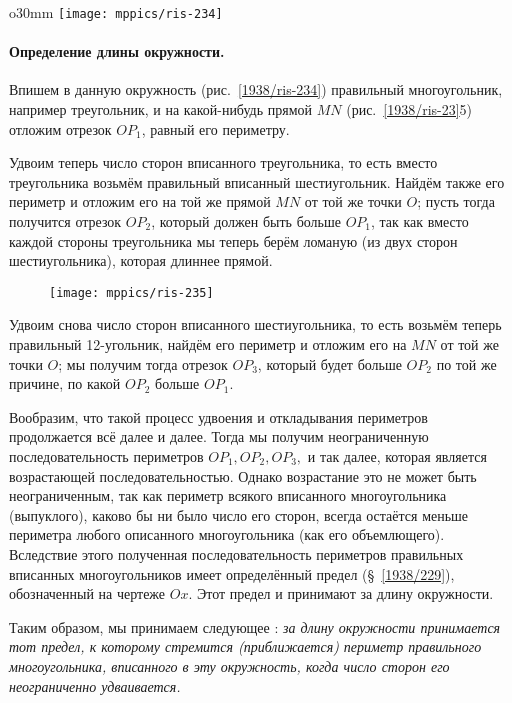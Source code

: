 \begin{wrapfigure}{o}{30mm}
\centering
\texttt{[image: mppics/ris-234]}
\caption{}\label{1938/ris-234}
\end{wrapfigure}

\paragraph{Определение длины окружности.}\label{1938/234}
Впишем в данную окружность (рис.~\ref{1938/ris-234}) правильный многоугольник, например треугольник, и на какой-нибудь прямой $MN$ (рис.~\ref{1938/ris-23}5) отложим отрезок $OP_1$, равный его периметру.

Удвоим теперь число сторон вписанного треугольника, то есть
вместо треугольника возьмём правильный вписанный шестиугольник.
Найдём также его периметр и отложим его на той же прямой $MN$ от той же точки $O$;
пусть тогда получится отрезок $OP_2$, который должен быть больше $OP_1$, так как вместо каждой стороны треугольника мы теперь берём ломаную (из двух сторон шестиугольника), которая длиннее прямой.

\begin{figure}[!ht]
\centering
\texttt{[image: mppics/ris-235]}
\caption{}\label{1938/ris-235}
\end{figure}

Удвоим снова число сторон вписанного шестиугольника, то есть возьмём теперь правильный 12-угольник, найдём его периметр и отложим его на $MN$ от той же точки $O$; 
мы получим тогда отрезок $OP_3$, который будет больше $OP_2$ по той же причине, по какой $OP_2$ больше $OP_1$.

Вообразим, что такой процесс удвоения и откладывания периметров продолжается всё далее и далее.
Тогда мы получим неограниченную последовательность периметров $OP_1, OP_2, OP_3,$ и так далее, которая является возрастающей последовательностью.
Однако возрастание это не может быть неограниченным, так как периметр всякого вписанного многоугольника (выпуклого), каково бы ни было число его сторон, всегда остаётся меньше периметра любого описанного многоугольника (как его объемлющего).
Вследствие этого полученная последовательность периметров правильных вписанных многоугольников имеет определённый предел (§~\ref{1938/229}), обозначенный на чертеже $Ox$.
Этот предел и принимают за длину окружности.

Таким образом, мы принимаем следующее :
\emph{за длину окружности принимается тот предел, к которому стремится (приближается) периметр правильного многоугольника, вписанного в эту окружность, когда число сторон его неограниченно удваивается.}

